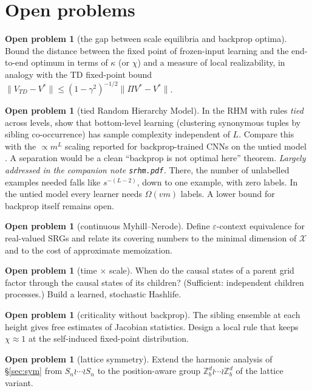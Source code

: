 \documentclass[11pt]{article}
\theoremstyle{definition}
\newtheorem{problem}[theorem]{Open problem}
\newcommand{\eps}{\varepsilon}
\newcommand{\cX}{\mathcal{X}}
\newcommand{\norm}[1]{\lVert #1\rVert}
\begin{document}
\section{Open problems}\label{sec:open}
\begin{problem}[the gap between scale equilibria and backprop optima]
Bound the distance between the fixed point of frozen-input learning and the end-to-end optimum
in terms of $\kappa$ (or $\chi$) and a measure of local realizability, in analogy with the TD
fixed-point bound $\norm{V_{TD}-V^*}\le(1-\gamma^2)^{-1/2}\norm{\Pi V^*-V^*}$.
\end{problem}
\begin{problem}[tied Random Hierarchy Model]
In the RHM with rules \emph{tied} across levels, show that bottom-level learning (clustering
synonymous tuples by sibling co-occurrence) has sample complexity independent of $L$. Compare
this with the $\propto m^{L}$ scaling reported for backprop-trained CNNs on the untied model
\cite{cagnetta2024}. A separation would be a clean ``backprop is not optimal here'' theorem.
\emph{Largely addressed in the companion note \texttt{srhm.pdf}.} There, the number of
unlabelled examples needed falls like $s^{-(L-2)}$, down to one example, with zero labels. In
the untied model every learner needs $\Omega(vm)$ labels. A lower bound for backprop itself
remains open.
\end{problem}
\begin{problem}[continuous Myhill--Nerode]
Define $\eps$-context equivalence for real-valued SRGs and relate its covering numbers to the
minimal dimension of $\cX$ and to the cost of approximate memoization.
\end{problem}
\begin{problem}[time $\times$ scale]
When do the causal states of a parent grid factor through the causal states of its children?
(Sufficient: independent children processes.) Build a learned, stochastic Hashlife.
\end{problem}
\begin{problem}[criticality without backprop]
The sibling ensemble at each height gives free estimates of Jacobian statistics. Design a local
rule that keeps $\chi\approx1$ at the self-induced fixed-point distribution.
\end{problem}
\begin{problem}[lattice symmetry]
Extend the harmonic analysis of \S\ref{sec:sym} from $S_n\wr\cdots\wr S_n$ to the
position-aware group $\mathbb Z_b^d\wr\cdots\wr\mathbb Z_b^d$ of the lattice variant.
\end{problem}
\end{document}
